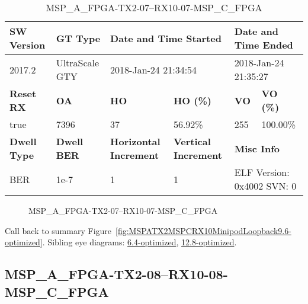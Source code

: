 \begin{table}[h]
\centering
\caption{MSP\_A\_FPGA-TX2-07--RX10-07-MSP\_C\_FPGA}
\label{tab:MSPAFPGATX207RX1007MSPCFPGA9.6-optimized}
\begin{tabular}{@{}|l|l|l|l|l|l|@{}}
\toprule
\textbf{SW Version}                & \textbf{GT Type}   & \multicolumn{2}{l|}{\textbf{Date and Time Started}}            & \multicolumn{2}{l|}{\textbf{Date and Time Ended}}        \\ \midrule
2017.2                       & UltraScale GTY          & \multicolumn{2}{l|}{2018-Jan-24 21:34:54}                   & \multicolumn{2}{l|}{2018-Jan-24 21:35:27}               \\ \midrule
\textbf{Reset RX}                  & \textbf{OA} & \textbf{HO}   & \textbf{HO (\%)} & \textbf{VO} & \textbf{VO (\%)} \\ \midrule
true & 7396        & 37          & 56.92\%        & 255        & 100.00\%       \\ \midrule
\textbf{Dwell Type}                & \textbf{Dwell BER} & \textbf{Horizontal Increment} & \textbf{Vertical Increment}    & \multicolumn{2}{l|}{\textbf{Misc Info}}                  \\ \midrule
BER                            & 1e-7        & 1        & 1           & \multicolumn{2}{l|}{ELF Version: 0x4002 SVN: 0}                         \\ \bottomrule
\end{tabular}
\end{table}

\begin{figure}[h]
\caption{MSP\_A\_FPGA-TX2-07--RX10-07-MSP\_C\_FPGA} \label{fig:MSPAFPGATX207RX1007MSPCFPGA9.6-optimized}
\end{figure}

Call back to summary Figure~\ref{fig:MSPATX2MSPCRX10MinipodLoopback9.6-optimized}.
Sibling eye diagrams: \hyperref[sec:MSPAFPGATX207RX1007MSPCFPGA6.4-optimized]{6.4-optimized}, \hyperref[sec:MSPAFPGATX207RX1007MSPCFPGA12.8-optimized]{12.8-optimized}.

\clearpage
\newpage


\subsection{MSP\_A\_FPGA-TX2-08--RX10-08-MSP\_C\_FPGA}\label{sec:MSPAFPGATX208RX1008MSPCFPGA9.6-optimized}

